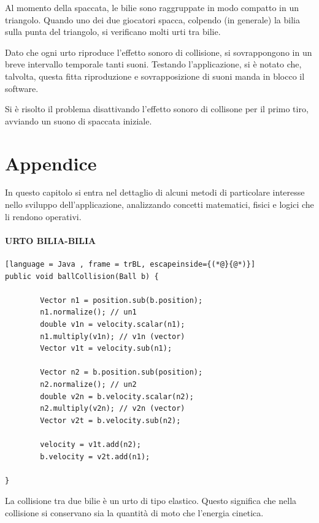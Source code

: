 \documentclass[12pt,a4paper]{report}
\begin{document}
\vspace{3mm}

Al momento della spaccata, le bilie sono raggruppate in modo compatto in un triangolo. Quando uno dei due giocatori spacca, colpendo (in generale) la bilia sulla punta del triangolo, si verificano molti urti tra bilie.

Dato che ogni urto riproduce l'effetto sonoro di collisione, si sovrappongono in un breve intervallo temporale tanti suoni.
Testando l'applicazione, si è notato che, talvolta, questa fitta riproduzione e sovrapposizione di suoni manda in blocco il software.

\vspace{3mm}

Si è risolto il problema disattivando l'effetto sonoro di collisone per il primo tiro, avviando un suono di spaccata iniziale.


\chapter{Appendice}\label{ch:Appendix} %
In questo capitolo si entra nel dettaglio di alcuni metodi di particolare interesse nello sviluppo dell'applicazione, analizzando concetti matematici, fisici e logici che li rendono operativi.

\subsubsection*{URTO BILIA-BILIA}

\begin{lstlisting}[language = Java , frame = trBL, escapeinside={(*@}{@*)}]
public void ballCollision(Ball b) {

        Vector n1 = position.sub(b.position);
        n1.normalize(); // un1
        double v1n = velocity.scalar(n1);
        n1.multiply(v1n); // v1n (vector)
        Vector v1t = velocity.sub(n1);

        Vector n2 = b.position.sub(position);
        n2.normalize(); // un2
        double v2n = b.velocity.scalar(n2);
        n2.multiply(v2n); // v2n (vector)
        Vector v2t = b.velocity.sub(n2);
        
        velocity = v1t.add(n2);
        b.velocity = v2t.add(n1);
        
}
\end{lstlisting}

\pagebreak

La collisione tra due bilie\cite{2DCollision} è un urto di tipo elastico. Questo significa che nella collisione si conservano sia la quantità di moto che l'energia cinetica.
\end{document}
